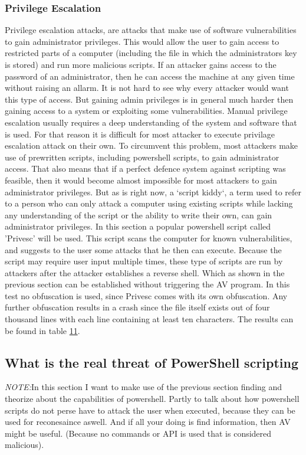 \documentclass{article}%
\begin{document}
\subsubsection{Privilege Escalation}
Privilege escalation attacks, are attacks that make use of software vulnerabilities to gain administrator privileges. This would allow the user to gain access to restricted parts of a computer (including the file in which the administrators key is stored) and run more malicious scripts. If an attacker gains access to the password of an administrator, then he can access the machine at any given time without raising an allarm. It is not hard to see why every attacker would want this type of access. But gaining admin privileges is in general much harder then gaining access to a system or exploiting some vulnerabilities. Manual privilege escalation usually requires a deep understanding of the system and software that is used. For that reason it is difficult for most attacker to execute privilage escalation attack on their own. To circumvent this problem, most attackers make use of prewritten scripts, including powershell scripts, to gain administrator access. That also means that if a perfect defence system against scripting was feasible, then it would become almost impossible for most attackers to gain administrator privileges. But as is right now, a `script kiddy`, a term used to refer to a person who can only attack a computer using existing scripts while lacking any understanding of the script or the ability to write their own, can gain administrator privileges. In this section a popular powershell script called 'Privesc' will be used. This script scans the computer for known vulnerabilities, and suggests to the user some attacks that he then can execute. Because the script may require user input multiple times, these type of scripts are run by attackers after the attacker establishes a reverse shell. Which as shown in the previous section can be established without triggering the AV program. In this test no obfuscation is used, since Privesc comes with its own obfuscation. Any further obfuscation results in a crash since the file itself exists out of four thousand lines with each line containing at least ten characters. The results can be found in table \hyperlink{table11}{11}.

\subsection{What is the real threat of PowerShell scripting}
\textit{NOTE:}In this section I want to make use of the previous section finding and theorize about the capabilities of powershell. Partly to talk about how powershell scripts do not perse have to attack the user when executed, because they can be used for reconesaince aswell. And if all your doing is find information, then AV might be useful. (Because no commands or API is used that is considered malicious).
\end{document}
